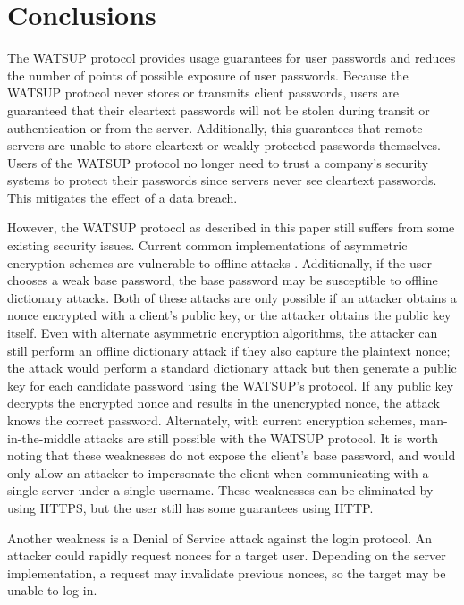 \section{Conclusions}
\label{sec:conclusion}

The WATSUP protocol provides usage guarantees for user passwords and reduces the number of points of possible exposure of user passwords. Because the WATSUP protocol never stores or transmits client passwords, users are guaranteed that their cleartext passwords will not be stolen during transit or authentication or from the server. Additionally, this guarantees that remote servers are unable to store cleartext or weakly protected passwords themselves. Users of the WATSUP protocol no longer need to trust a company's security systems to protect their passwords since servers never see cleartext passwords. This mitigates the effect of a data breach.

However, the WATSUP protocol as described in this paper still suffers from some existing security issues. Current common implementations of asymmetric encryption schemes are vulnerable to offline attacks \cite{Blumenthal:2007}. Additionally, if the user chooses a weak base password, the base password may be susceptible to offline dictionary attacks. Both of these attacks are only possible if an attacker obtains a nonce encrypted with a client's public key, or the attacker obtains the public key itself. Even with alternate asymmetric encryption algorithms, the attacker can still perform an offline dictionary attack if they also capture the plaintext nonce; the attack would perform a standard dictionary attack but then generate a public key for each candidate password using the WATSUP's protocol. If any public key decrypts the encrypted nonce and results in the unencrypted nonce, the attack knows the correct password. Alternately, with current encryption schemes, man-in-the-middle attacks are still possible with the WATSUP protocol. It is worth noting that these weaknesses do not expose the client's base password, and would only allow an attacker to impersonate the client when communicating with a single server under a single username. These weaknesses can be eliminated by using HTTPS, but the user still has some guarantees using HTTP.

Another weakness is a Denial of Service attack against the login protocol. An attacker could rapidly request nonces for a target user. Depending on the server implementation, a request may invalidate previous nonces, so the target may be unable to log in.

